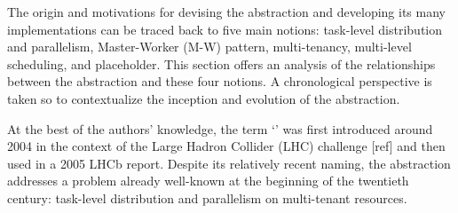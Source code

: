 \documentclass{sig-alternate}
\begin{document}






The origin and motivations for devising the \pilot abstraction and developing
its many implementations can be traced back to five main notions: task-level
distribution and parallelism, Master-Worker (M-W) pattern, multi-tenancy,
multi-level scheduling, and placeholder. This section offers an analysis of the
relationships between the \pilot abstraction and these four notions. A
chronological perspective is taken so to contextualize the inception and
evolution of the
\pilot abstraction.

At the best of the authors' knowledge, the term `\pilotjob' was first
introduced around 2004 in the context of the Large Hadron Collider (LHC)
challenge [ref] and then used in a 2005 LHCb report\cite{lhcb2005}. Despite its
relatively recent naming, the \pilot abstraction addresses a problem already
well-known at the beginning of the twentieth century: task-level distribution
and parallelism on multi-tenant resources.
\end{document}
